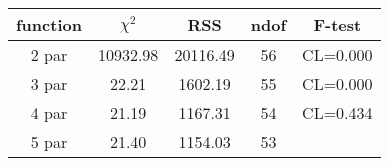 \begin{tabular}{c|c|c|c|c}
function & $\chi^2$ & RSS & ndof & F-test \\
\hline
2 par & 10932.98 & 20116.49 & 56 & CL=0.000 \\
3 par & 22.21 & 1602.19 & 55 & CL=0.000 \\
4 par & 21.19 & 1167.31 & 54 & CL=0.434 \\
5 par & 21.40 & 1154.03 & 53 & \\
\hline
\end{tabular}